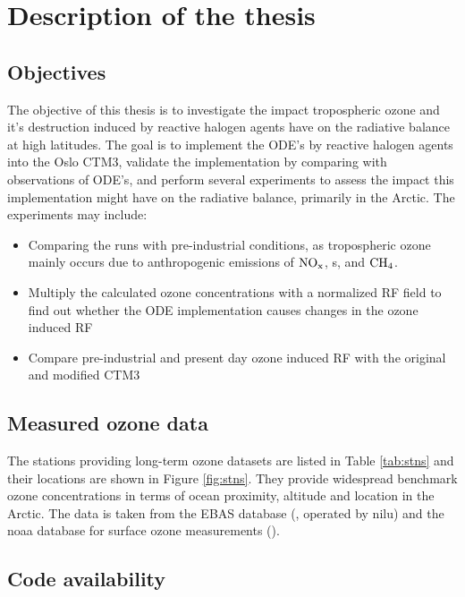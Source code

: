 \section{Description of the thesis}

\subsection{Objectives}

The objective of this thesis is to investigate the impact tropospheric ozone and it's destruction induced by reactive halogen agents have on the radiative balance at high latitudes. The goal is to implement the ODE's by reactive halogen agents into the Oslo CTM3, validate the implementation by comparing with observations of ODE's, and perform several experiments to assess the  impact this implementation might have on the radiative balance, primarily in the Arctic. The experiments may include: 

\begin{itemize}
    \item Comparing the runs with pre-industrial conditions, as tropospheric ozone mainly occurs due to anthropogenic emissions of $\mathrm{NO_x}$, s,  and $\mathrm{CH_4}$.
    \item Multiply the calculated ozone concentrations with a normalized RF field to find out whether the ODE implementation causes changes in the ozone induced RF
    \item Compare pre-industrial and present day ozone induced RF with the original and modified CTM3
\end{itemize}

\subsection{Measured ozone data}

The stations providing long-term ozone datasets are listed in Table \ref{tab:stns} and their locations are shown in Figure \ref{fig:stns}. They provide widespread benchmark ozone concentrations in terms of ocean proximity, altitude and location in the Arctic. The data is taken from the EBAS database (\cite{EBAS}, operated by \acrfull{nilu}) and the \acrfull{noaa} database for surface ozone measurements (\cite{NOAA}).




\subsection{Code availability}

